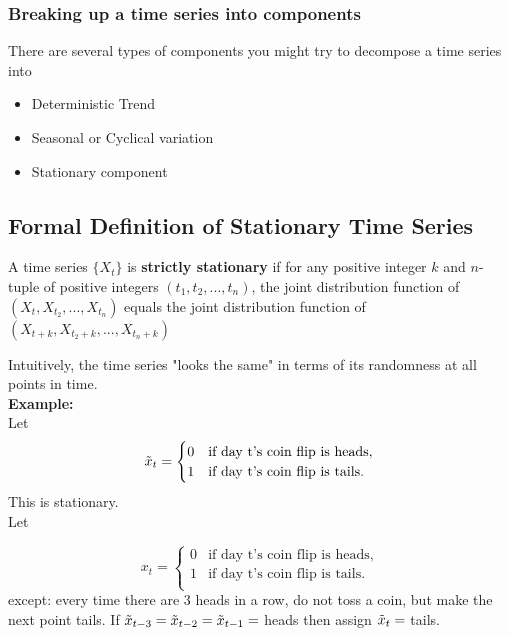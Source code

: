 \subsubsection{Breaking up a time series into components}
There are several types of components you might try to decompose a time series into
\begin{itemize}
    \item Deterministic Trend
    \item Seasonal or Cyclical variation
    \item Stationary component
\end{itemize}

\subsection{Formal Definition of Stationary Time Series}

\begin{mdframed}
A time series $\{X_t\}$ is \textbf{strictly stationary} if for any positive integer $k$ and $n$-tuple of positive integers $(t_1,t_2,...,t_n)$, the joint distribution function of $(X_t, X_{t_2},...,X_{t_n})$ equals the joint distribution function of $(X_{t+k}, X_{t_2+k}, ..., X_{t_n+k})$
\end{mdframed}


Intuitively, the time series "looks the same" in terms of its randomness at all points in time.\\

\textbf{Example:}\\

Let 
\[\Tilde{x}_t = 
\begin{cases} 
0 & \text{if day t's coin flip is heads}, \\
1 & \text{if day t's coin flip is tails}.
\end{cases}
\]
This is stationary.\\

Let

\[x_t = 
\begin{cases} 
0 & \text{if day t's coin flip is heads}, \\
1 & \text{if day t's coin flip is tails}. \\
\end{cases}
\]
except: \quad every time there are 3 heads in a row, do not toss a coin, but make the next point tails. If $\Tilde{x}_{t-3}=\Tilde{x}_{t-2}=\Tilde{x}_{t-1}=$ heads then assign $\Tilde{x}_t=$ tails.\\

